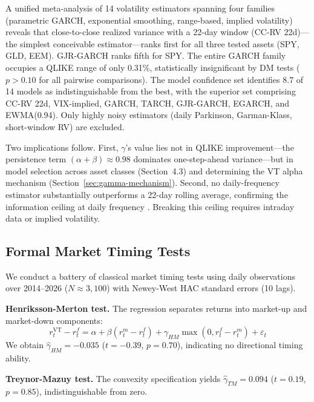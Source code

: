 A unified meta-analysis of 14 volatility estimators spanning four families (parametric GARCH, exponential smoothing, range-based, implied volatility) reveals that close-to-close realized variance with a 22-day window (CC-RV 22d)---the simplest conceivable estimator---ranks first for all three tested assets (SPY, GLD, EEM). GJR-GARCH ranks fifth for SPY. The entire GARCH family occupies a QLIKE range of only 0.31\%, statistically insignificant by DM tests ($p > 0.10$ for all pairwise comparisons). The model confidence set \citep{hansen2005} identifies 8.7 of 14 models as indistinguishable from the best, with the superior set comprising CC-RV 22d, VIX-implied, GARCH, TARCH, GJR-GARCH, EGARCH, and EWMA(0.94). Only highly noisy estimators (daily Parkinson, Garman-Klass, short-window RV) are excluded.

Two implications follow. First, $\gamma$'s value lies not in QLIKE improvement---the persistence term $(\alpha + \beta) \approx 0.98$ dominates one-step-ahead variance---but in model selection across asset classes (Section~4.3) and determining the VT alpha mechanism (Section~\ref{sec:gamma-mechanism}). Second, no daily-frequency estimator substantially outperforms a 22-day rolling average, confirming the information ceiling at daily frequency \citep{patton2011}. Breaking this ceiling requires intraday data or implied volatility.

\subsection{Formal Market Timing Tests}
\label{sec:timing_tests}

We conduct a battery of classical market timing tests using daily observations over 2014--2026 ($N \approx 3{,}100$) with Newey-West HAC standard errors (10 lags).

\textbf{Henriksson-Merton test.} The \citet{henriksson1981} regression separates returns into market-up and market-down components:
\begin{equation}
r^{\text{VT}}_t - r^f_t = \alpha + \beta (r^m_t - r^f_t) + \gamma_{HM} \max(0, r^f_t - r^m_t) + \varepsilon_t
\end{equation}
We obtain $\hat{\gamma}_{HM} = -0.035$ ($t = -0.39$, $p = 0.70$), indicating no directional timing ability.

\textbf{Treynor-Mazuy test.} The \citet{treynor1966} convexity specification yields $\hat{\gamma}_{TM} = 0.094$ ($t = 0.19$, $p = 0.85$), indistinguishable from zero.

